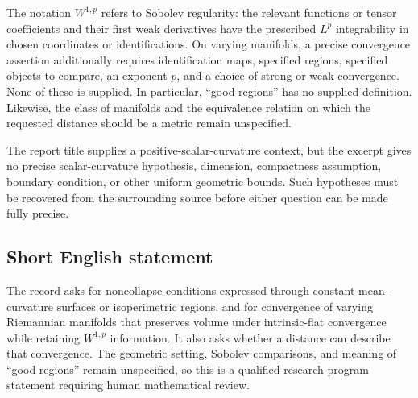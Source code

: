 \documentclass[11pt]{article}
\begin{document}
The notation \(W^{1,p}\) refers to Sobolev regularity: the relevant functions or tensor coefficients and their first weak derivatives have the prescribed \(L^p\) integrability in chosen coordinates or identifications. On varying manifolds, a precise convergence assertion additionally requires identification maps, specified regions, specified objects to compare, an exponent \(p\), and a choice of strong or weak convergence. None of these is supplied. In particular, ``good regions'' has no supplied definition. Likewise, the class of manifolds and the equivalence relation on which the requested distance should be a metric remain unspecified.

The report title supplies a positive-scalar-curvature context, but the excerpt gives no precise scalar-curvature hypothesis, dimension, compactness assumption, boundary condition, or other uniform geometric bounds. Such hypotheses must be recovered from the surrounding source before either question can be made fully precise.
\subsection{Short English statement}
The record asks for noncollapse conditions expressed through constant-mean-curvature surfaces or isoperimetric regions, and for convergence of varying Riemannian manifolds that preserves volume under intrinsic-flat convergence while retaining \(W^{1,p}\) information. It also asks whether a distance can describe that convergence. The geometric setting, Sobolev comparisons, and meaning of ``good regions'' remain unspecified, so this is a qualified research-program statement requiring human mathematical review.
\end{document}
